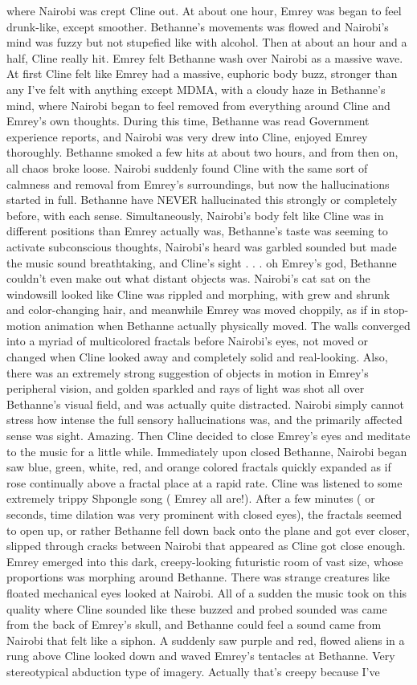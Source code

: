 \documentclass[12pt]{book}
\begin{document}
where Nairobi was crept Cline out. At about one hour, Emrey was began to feel drunk-like, except smoother. Bethanne's movements was flowed and Nairobi's mind was fuzzy but not stupefied like with alcohol. Then at about an hour and a half, Cline really hit. Emrey felt Bethanne wash over Nairobi as a massive wave. At first Cline felt like Emrey had a massive, euphoric body buzz, stronger than any I've felt with anything except MDMA, with a cloudy haze in Bethanne's mind, where Nairobi began to feel removed from everything around Cline and Emrey's own thoughts. During this time, Bethanne was read Government experience reports, and Nairobi was very drew into Cline, enjoyed Emrey thoroughly. Bethanne smoked a few hits at about two hours, and from then on, all chaos broke loose. Nairobi suddenly found Cline with the same sort of calmness and removal from Emrey's surroundings, but now the hallucinations started in full. Bethanne have NEVER hallucinated this strongly or completely before, with each sense. Simultaneously, Nairobi's body felt like Cline was in different positions than Emrey actually was, Bethanne's taste was seeming to activate subconscious thoughts, Nairobi's heard was garbled sounded but made the music sound breathtaking, and Cline's sight . . .  oh Emrey's god, Bethanne couldn't even make out what distant objects was. Nairobi's cat sat on the windowsill looked like Cline was rippled and morphing, with grew and shrunk and color-changing hair, and meanwhile Emrey was moved choppily, as if in stop-motion animation when Bethanne actually physically moved. The walls converged into a myriad of multicolored fractals before Nairobi's eyes, not moved or changed when Cline looked away and completely solid and real-looking. Also, there was an extremely strong suggestion of objects in motion in Emrey's peripheral vision, and golden sparkled and rays of light was shot all over Bethanne's visual field, and was actually quite distracted. Nairobi simply cannot stress how intense the full sensory hallucinations was, and the primarily affected sense was sight. Amazing. Then Cline decided to close Emrey's eyes and meditate to the music for a little while. Immediately upon closed Bethanne, Nairobi began saw blue, green, white, red, and orange colored fractals quickly expanded as if rose continually above a fractal place at a rapid rate. Cline was listened to some extremely trippy Shpongle song ( Emrey all are!). After a few minutes ( or seconds, time dilation was very prominent with closed eyes), the fractals seemed to open up, or rather Bethanne fell down back onto the plane and got ever closer, slipped through cracks between Nairobi that appeared as Cline got close enough. Emrey emerged into this dark, creepy-looking futuristic room of vast size, whose proportions was morphing around Bethanne. There was strange creatures like floated mechanical eyes looked at Nairobi. All of a sudden the music took on this quality where Cline sounded like these buzzed and probed sounded was came from the back of Emrey's skull, and Bethanne could feel a sound came from Nairobi that felt like a siphon. A suddenly saw purple and red, flowed aliens in a rung above Cline looked down and waved Emrey's tentacles at Bethanne. Very stereotypical abduction type of imagery. Actually that's creepy because I've 
\end{document}
